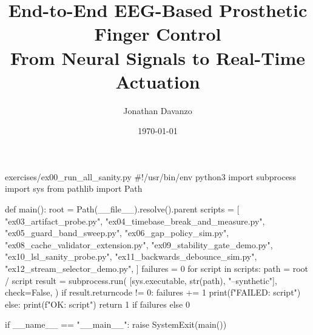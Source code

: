 \documentclass[11pt,openany]{book}
\title{
\textbf{End-to-End EEG-Based Prosthetic Finger Control}\\
\vspace{0.5em}
\large From Neural Signals to Real-Time Actuation
}
\author{Jonathan Davanzo}
\date{\today}
\begin{document}
\begin{filecontents*}{exercises/ex00_run_all_sanity.py}
#!/usr/bin/env python3
import subprocess
import sys
from pathlib import Path


def main():
    root = Path(__file__).resolve().parent
    scripts = [
        "ex03_artifact_probe.py",
        "ex04_timebase_break_and_measure.py",
        "ex05_guard_band_sweep.py",
        "ex06_gap_policy_sim.py",
        "ex08_cache_validator_extension.py",
        "ex09_stability_gate_demo.py",
        "ex10_lsl_sanity_probe.py",
        "ex11_backwards_debounce_sim.py",
        "ex12_stream_selector_demo.py",
    ]
    failures = 0
    for script in scripts:
        path = root / script
        result = subprocess.run(
            [sys.executable, str(path), "--synthetic"],
            check=False,
        )
        if result.returncode != 0:
            failures += 1
            print(f"FAILED: {script}")
        else:
            print(f"OK: {script}")
    return 1 if failures else 0


if __name__ == "__main__":
    raise SystemExit(main())
\end{filecontents*}
\end{document}
